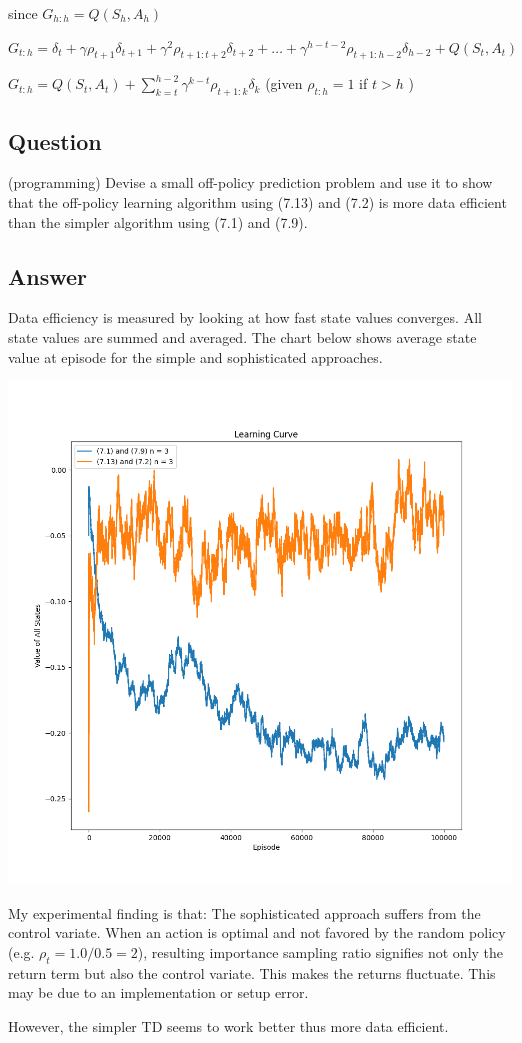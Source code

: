 \documentclass[11pt]{article}
\begin{document}
    \noindent since $ G_{h:h} = Q(S_h,A_h) $

    \noindent $ G_{t:h} = \delta_{t} + \gamma \rho_{t+1} \delta_{t+1} + \gamma^2 \rho_{t+1:t+2} \delta_{t+2} + \dots +  \gamma^{h-t-2} \rho_{t+1:h-2} \delta_{h-2} + Q(S_t,A_t) $

    \noindent $ G_{t:h} = Q(S_t,A_t) + \sum_{k=t}^{h-2} \gamma^{k-t} \rho_{t+1:k} \delta_k $ (given $ \rho_{t:h} = 1$ if $ t>h $ )


    \subsection{Question}

    (programming) Devise a small off-policy prediction problem and use it to show that the off-policy learning algorithm using (7.13) and (7.2) is more data efficient than the simpler algorithm using (7.1) and (7.9).

    \subsection*{Answer}

    Data efficiency is measured by looking at how fast state values converges.
    All state values are summed and averaged.
    The chart below shows average state value at episode for the simple and sophisticated approaches.

    \includegraphics[scale=0.5]{figure_7_10}

    My experimental finding is that: The sophisticated approach suffers from the control variate.
    When an action is optimal and not favored by the random policy (e.g. $ \rho_t = 1.0/0.5 = 2 $), resulting importance sampling ratio signifies not only the return term but also the control variate.
    This makes the returns fluctuate.
    This may be due to an implementation or setup error.

    However, the simpler TD seems to work better thus more data efficient.
\end{document}
